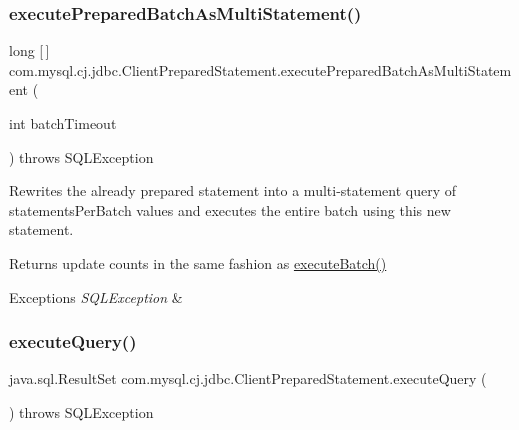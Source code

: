 \subsubsection{\texorpdfstring{execute\+Prepared\+Batch\+As\+Multi\+Statement()}{executePreparedBatchAsMultiStatement()}}
{\footnotesize\ttfamily long \mbox{[}$\,$\mbox{]} com.\+mysql.\+cj.\+jdbc.\+Client\+Prepared\+Statement.\+execute\+Prepared\+Batch\+As\+Multi\+Statement (\begin{DoxyParamCaption}\item[{int}]{batch\+Timeout }\end{DoxyParamCaption}) throws S\+Q\+L\+Exception\hspace{0.3cm}{\ttfamily [protected]}}

Rewrites the already prepared statement into a multi-\/statement query of \textquotesingle{}statements\+Per\+Batch\textquotesingle{} values and executes the entire batch using this new statement.

\begin{DoxyReturn}{Returns}
update counts in the same fashion as \mbox{\hyperlink{classcom_1_1mysql_1_1cj_1_1jdbc_1_1_statement_impl_a812ff94727864cc68fe96aaa38dbce6a}{execute\+Batch()}}
\end{DoxyReturn}

\begin{DoxyExceptions}{Exceptions}
{\em S\+Q\+L\+Exception} & \\
\hline
\end{DoxyExceptions}
\mbox{\label{classcom_1_1mysql_1_1cj_1_1jdbc_1_1_client_prepared_statement_a3c87e86e004b4f406cef86e3738546b8}} 
\subsubsection{\texorpdfstring{execute\+Query()}{executeQuery()}}
{\footnotesize\ttfamily java.\+sql.\+Result\+Set com.\+mysql.\+cj.\+jdbc.\+Client\+Prepared\+Statement.\+execute\+Query (\begin{DoxyParamCaption}{ }\end{DoxyParamCaption}) throws S\+Q\+L\+Exception}


